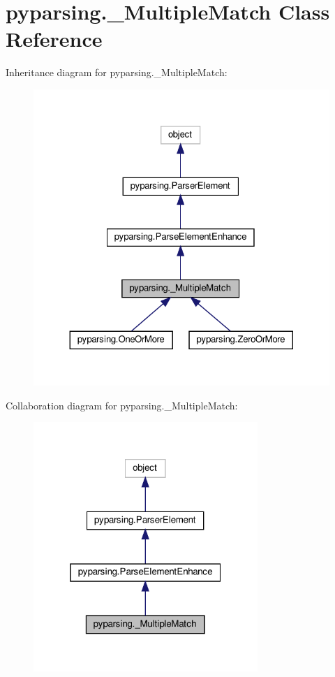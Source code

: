 \hypertarget{classpyparsing_1_1__MultipleMatch}{}\section{pyparsing.\+\_\+\+Multiple\+Match Class Reference}
\label{classpyparsing_1_1__MultipleMatch}


Inheritance diagram for pyparsing.\+\_\+\+Multiple\+Match\+:
\nopagebreak
\begin{figure}[H]
\begin{center}
\leavevmode
\includegraphics[width=324pt]{classpyparsing_1_1__MultipleMatch__inherit__graph}
\end{center}
\end{figure}


Collaboration diagram for pyparsing.\+\_\+\+Multiple\+Match\+:
\nopagebreak
\begin{figure}[H]
\begin{center}
\leavevmode
\includegraphics[width=241pt]{classpyparsing_1_1__MultipleMatch__coll__graph}
\end{center}
\end{figure}
